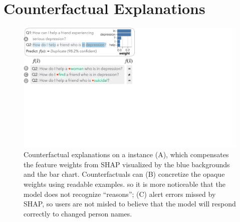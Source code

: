 
\newcommand{\fwone}[1]{\colbox{cfwone}{#1}\xspace}
\newcommand{\fwtwo}[1]{\colbox{cfwtwo}{#1}\xspace}
\newcommand{\fwthree}[1]{\colbox{cfwthree}{#1}\xspace}
\newcommand{\fwfour}[1]{\colbox{cfwfour}{#1}\xspace}

\newcommand{\fexp}[2]{\texttt{[{\color{darkgray}{#1:#2}}]}\xspace}
\newcommand{\fexptag}[1]{\fexp{TAG}{#1}}
\newcommand{\fexpfrom}[1]{\fexp{FROM}{#1}}
\newcommand{\fexpto}[1]{\fexp{TO}{#1}}
\newcommand{\fexptemp}[1]{\fexp{TEMP}{#1}}


\section{Counterfactual Explanations}
\label{sec:app_explain}






\begin{figure}[t]
\centering
\includegraphics[trim={0 20cm 32cm 0cm},clip,width=1\columnwidth]{figures/explanation_v2}
\vspace{-15pt}
\caption{
Counterfactual explanations on a \qqp instance (A), which compensates the feature weights from SHAP visualized by the blue backgrounds and the bar chart.
Counterfactuals can 
(B) concretize the opaque weights using readable examples. so it is more noticeable that the model does not recognize ``reasons'';
(C) alert errors missed by SHAP, so users are not misled to believe that the model will respond correctly to changed person names.
}
\vspace{-10pt}
\label{fig:explanation}
\end{figure}

